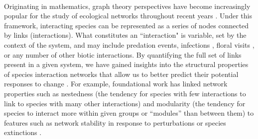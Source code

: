 \documentclass[12pt]{article}
\begin{document}
\paragraph*{}
Originating in mathematics, graph theory perspectives have become increasingly popular for the study of ecological networks throughout recent years \citep{bascompte2007plant, landi2018complexity, valdovinos2019mutualistic, guimaraes2020structure}. Under this framework, interacting species can be represented as a series of nodes connected by links (interactions). What constitutes an ``interaction" is variable, set by the context of the system, and may include predation events, infections \citep{dallas2017predicting}, floral visits \citep{Young21}, or any number of other biotic interactions. By quantifying the full set of links present in a given system, we have gained insights into the structural properties of species interaction networks that allow us to better predict their potential responses to change \citep{gilarranz2017effects}. For example, foundational work has linked network properties such as nestedness (the tendency for species with few interactions to link to species with many other interactions) and modularity (the tendency for species to interact more within given groups or ``modules'' than between them) to features such as network stability in response to perturbations or species extinctions \citep{okuyama2008network, thebault2010stability, suweis2013emergence}.
\end{document}
